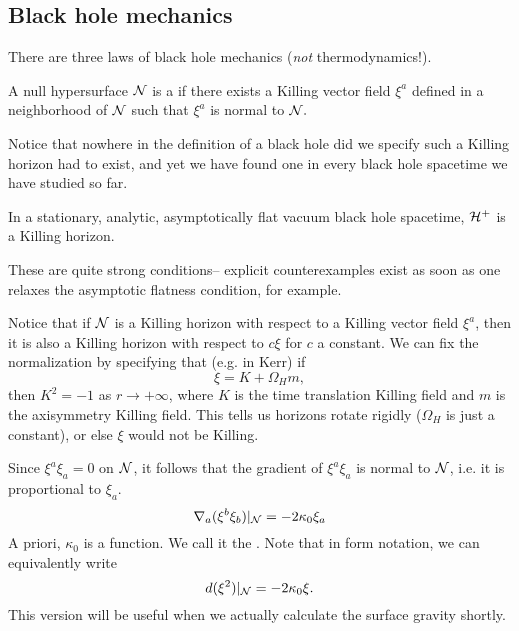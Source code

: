 
\subsection*{Black hole mechanics}
There are three laws of black hole mechanics (\emph{not} thermodynamics!).
\begin{defn}
    A null hypersurface $\mathcal N$ is a  if there exists a Killing vector field $\xi^a$ defined in a neighborhood of $\mathcal N$ such that $\xi^a$ is normal to $\mathcal N.$
\end{defn}
Notice that nowhere in the definition of a black hole did we specify such a Killing horizon had to exist, and yet we have found one in every black hole spacetime we have studied so far.
\begin{thm}[Hawking 1972]
    In a stationary, analytic, asymptotically flat vacuum black hole spacetime, $\mathcal H^+$ is a Killing horizon.
\end{thm}
These are quite strong conditions-- explicit counterexamples exist as soon as one relaxes the asymptotic flatness condition, for example. 

Notice that if $\mathcal N$ is a Killing horizon with respect to a Killing vector field $\xi^a$, then it is also a Killing horizon with respect to $c\xi$ for $c$ a constant. We can fix the normalization by specifying that (e.g. in Kerr) if
\begin{equation}
    \xi = K+\Omega_H m,
\end{equation}
then $K^2=-1$ as $r\to +\infty$, where $K$ is the time translation Killing field and $m$ is the axisymmetry Killing field. This tells us horizons rotate rigidly ($\Omega_H$ is just a constant), or else $\xi$ would not be Killing.

Since $\xi^a\xi_a=0$ on $\mathcal N$, it follows that the gradient of $\xi^a\xi_a$ is normal to $\mathcal N$, i.e. it is proportional to $\xi_a$.
\begin{equation}
    \nabla_a(\xi^b \xi_b)|_\mathcal N = -2 \kappa_0 \xi_a
\end{equation}
A priori, $\kappa_0$ is a function. We call it the .
Note that in form notation, we can equivalently write
\begin{equation}
    d(\xi^2)|_{\mathcal N}= - 2\kappa_0 \xi.
\end{equation}
This version will be useful when we actually calculate the surface gravity shortly.

